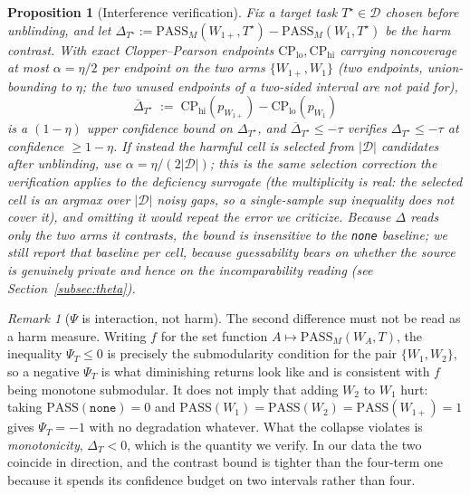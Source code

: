 \documentclass[11pt]{article}
\theoremstyle{plain}
\newtheorem{proposition}{Proposition}
\theoremstyle{definition}
\theoremstyle{remark}
\newtheorem{remark}{Remark}
\newcommand{\PASS}{\mathrm{PASS}}
\newcommand{\Dcal}{\mathcal{D}}
\begin{document}
\begin{proposition}[Interference verification]
\label{prop:interference}
Fix a target task $T^\star\in \Dcal$ chosen \emph{before} unblinding, and let
$\Delta_{T^\star} := \PASS_M(W_{1+},T^\star)-\PASS_M(W_1,T^\star)$ be the harm contrast. With exact
Clopper--Pearson endpoints $\mathrm{CP}_{\mathrm{lo}},\mathrm{CP}_{\mathrm{hi}}$ carrying
noncoverage at most $\alpha=\eta/2$ \emph{per endpoint} on the two arms $\{W_{1+},W_1\}$ (two
endpoints, union-bounding to $\eta$; the two unused endpoints of a two-sided interval are not
paid for),
\begin{equation}
\label{eq:deltaupper}
\overline\Delta_{T^\star} \;:=\; \mathrm{CP}_{\mathrm{hi}}(p_{W_{1+}}) - \mathrm{CP}_{\mathrm{lo}}(p_{W_1})
\end{equation}
is a $(1-\eta)$ upper confidence bound on $\Delta_{T^\star}$, and $\overline\Delta_{T^\star}\le-\tau$
verifies $\Delta_{T^\star}\le-\tau$ at confidence $\ge 1-\eta$. If instead the harmful cell is
\emph{selected} from $|\Dcal|$ candidates after unblinding, use $\alpha=\eta/(2|\Dcal|)$;
this is the same selection correction the verification applies to the deficiency surrogate
(the multiplicity is real: the selected cell is an argmax over $|\Dcal|$ noisy gaps, so a
single-sample sup inequality does not cover it), and omitting it would repeat the error we
criticize. Because
$\Delta$ reads only the two arms it contrasts, the bound is insensitive to the \texttt{none}
baseline; we still report that baseline per cell, because guessability bears on whether the source
is genuinely private and hence on the incomparability reading (see Section~\ref{subsec:theta}).
\end{proposition}

\begin{remark}[$\Psi$ is interaction, not harm]
\label{rem:psinotharm}
The second difference must not be read as a harm measure. Writing $f$ for the set function
$A\mapsto\PASS_M(W_A,T)$, the inequality $\Psi_T\le 0$ is precisely the submodularity condition for
the pair $\{W_1,W_2\}$, so a negative $\Psi_T$ is what diminishing returns look like and is
consistent with $f$ being monotone submodular. It does not imply that adding $W_2$ to $W_1$ hurt:
taking $\PASS(\texttt{none})=0$ and $\PASS(W_1)=\PASS(W_2)=\PASS(W_{1+})=1$ gives $\Psi_T=-1$ with
no degradation whatever. What the collapse violates is \emph{monotonicity}, $\Delta_T<0$, which is
the quantity we verify. In our data the two coincide in direction, and the contrast bound is
tighter than the four-term one because it spends its confidence budget on two intervals rather
than four.
\end{remark}
\end{document}
